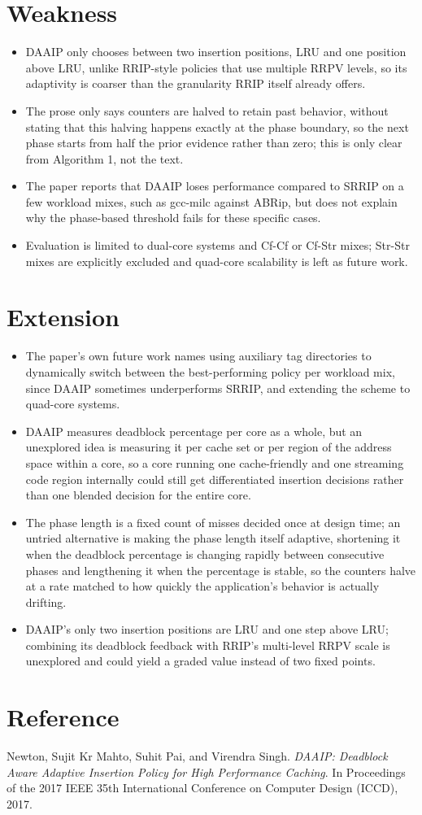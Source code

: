 \documentclass[10pt, conference]{IEEEtran}
\begin{document}
\section{Weakness}
\begin{itemize}[leftmargin=*, itemsep=0pt, topsep=1pt, parsep=0pt]
    \item DAAIP only chooses between two insertion positions, LRU and one position above LRU, unlike RRIP-style policies that use multiple RRPV levels, so its adaptivity is coarser than the granularity RRIP itself already offers.
    \item The prose only says counters are halved to retain past behavior, without stating that this halving happens exactly at the phase boundary, so the next phase starts from half the prior evidence rather than zero; this is only clear from Algorithm 1, not the text.
    \item The paper reports that DAAIP loses performance compared to SRRIP on a few workload mixes, such as gcc-milc against ABRip, but does not explain why the phase-based threshold fails for these specific cases.
    \item Evaluation is limited to dual-core systems and Cf-Cf or Cf-Str mixes; Str-Str mixes are explicitly excluded and quad-core scalability is left as future work.
\end{itemize}

\section{Extension}
\begin{itemize}[leftmargin=*, itemsep=0pt, topsep=1pt, parsep=0pt]
    \item The paper's own future work names using auxiliary tag directories to dynamically switch between the best-performing policy per workload mix, since DAAIP sometimes underperforms SRRIP, and extending the scheme to quad-core systems.
    \item DAAIP measures deadblock percentage per core as a whole, but an unexplored idea is measuring it per cache set or per region of the address space within a core, so a core running one cache-friendly and one streaming code region internally could still get differentiated insertion decisions rather than one blended decision for the entire core.
    \item The phase length is a fixed count of misses decided once at design time; an untried alternative is making the phase length itself adaptive, shortening it when the deadblock percentage is changing rapidly between consecutive phases and lengthening it when the percentage is stable, so the counters halve at a rate matched to how quickly the application's behavior is actually drifting.
    \item DAAIP's only two insertion positions are LRU and one step above LRU; combining its deadblock feedback with RRIP's multi-level RRPV scale is unexplored and could yield a graded value instead of two fixed points.
\end{itemize}

\section{Reference}
Newton, Sujit Kr Mahto, Suhit Pai, and Virendra Singh. \emph{DAAIP: Deadblock Aware Adaptive Insertion Policy for High Performance Caching}. In Proceedings of the 2017 IEEE 35th International Conference on Computer Design (ICCD), 2017.
\end{document}
